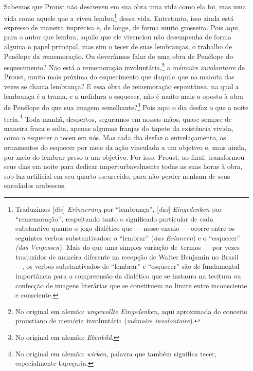 Sabemos que Proust não descreveu em sua obra uma vida como ela foi, mas
uma vida como aquele que a viveu lembra\footnote{Traduzimos
  {[}\emph{die}{]} \emph{Erinnerung} por ``lembrança'', {[}\emph{das}{]}
  \emph{Eingedenken} por ``rememoração'', respeitando tanto o significado
  particular de cada substantivo quanto o jogo dialético que --- nesse
  ensaio --- ocorre entre os seguintes verbos substantivados: o ``lembrar'' (\emph{das Erinnern}) e o ``esquecer'' \emph{(das
  Vergessen}). Mais do que uma simples variação de~termos --- por vezes
  traduzidos de maneira diferente na recepção de Walter Benjamin no
  Brasil ---, os verbos substantivados de ``lembrar'' e ``esquecer'' são
  de fundamental importância para a compreensão da dialética que se
  instaura na tecitura ou confecção de imagens literárias que se
  constituem no limite entre inconsciente e consciente. \versal{[N.~T.]}} dessa vida.
Entretanto, isso ainda está expresso de maneira imprecisa e, de longe, de
forma muito grosseira. Pois aqui, para o autor que lembra, aquilo que ele vivenciou não
desempenha de forma alguma o papel principal,
mas sim o tecer de suas lembranças, o trabalho de Penélope da
rememoração. Ou deveríamos falar de uma obra de Penélope do
esquecimento? Não está a rememoração involuntária,\footnote{No
  original em alemão: \emph{ungewollte Eingedenken}, aqui aproximada do
  conceito proustiano de memória involuntária (\emph{mémoire
  involontaire}). \versal{[N.~T.]}} a \emph{mémoire involontaire} de Proust, muito mais
próxima do esquecimento que daquilo que na maioria das vezes se chama
lembrança? E essa obra de rememoração espontânea, na qual a lembrança é
a trama, e a urdidura o esquecer, não é muito mais o oposto à obra de
Penélope do que sua imagem semelhante?\footnote{No original em alemão:
  \emph{Ebenbild}. \versal{[N.~T.]}} Pois aqui o dia desfaz o que a noite
tecia.\footnote{No original em alemão: \emph{wirken}, palavra que
  também significa tecer, especialmente tapeçaria. \versal{[N.~T.]}} Toda manhã,
despertos, seguramos em nossas mãos, quase sempre de maneira fraca e
solta, apenas algumas franjas do tapete da existência vivida, como o
esquecer o teceu em nós. Mas cada dia desfaz o entrelaçamento, os
ornamentos do esquecer por meio da ação vinculada a um objetivo e, mais
ainda, por meio do lembrar preso a um objetivo. Por isso, Proust, ao
final, transformou seus dias em noite para dedicar imperturbavelmente
todas as suas horas à obra, sob luz artificial em seu quarto escurecido,
para não perder nenhum de seus enredados arabescos.


